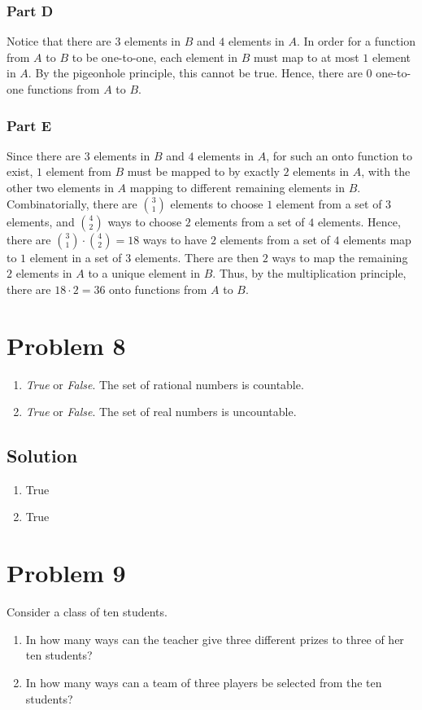 \documentclass[table]{article}
\begin{document}
\subsubsection{Part D}
Notice that there are $3$ elements in $B$ and $4$ elements in $A$. In order for a function from $A$ to $B$ to be one-to-one, each element in $B$ must map to at most $1$ element in $A$. By the pigeonhole principle, this cannot be true. Hence, there are $0$ one-to-one functions from $A$ to $B$.
\subsubsection{Part E}
Since there are $3$ elements in $B$ and $4$ elements in $A$, for such an onto function to exist, $1$ element from $B$ must be mapped to by exactly $2$ elements in $A$, with the other two elements in $A$ mapping to different remaining elements in $B$. Combinatorially, there are $3 \choose 1$ elements to choose $1$ element from a set of $3$ elements, and $4 \choose 2$ ways to choose $2$ elements from a set of $4$ elements. Hence, there are ${3 \choose 1} \cdot {4 \choose 2}=18$ ways to have $2$ elements from a set of $4$ elements map to $1$ element in a set of $3$ elements. There are then $2$ ways to map the remaining $2$ elements in $A$ to a unique element in $B$. Thus, by the multiplication principle, there are $18 \cdot 2 = 36$ onto functions from $A$ to $B$.
\section{Problem 8}
\begin{enumerate}[nosep,label=\alph*)]
\item \textit{True} or \textit{False}. The set of rational numbers is countable.
\item \textit{True} or \textit{False}. The set of real numbers is uncountable.
\end{enumerate}
\subsection{Solution}
\begin{enumerate}[nosep,label=\alph*)]
\item True
\item True
\end{enumerate}
\section{Problem 9}
Consider a class of ten students.
\begin{enumerate}[nosep,label=\alph*)]
\item In how many ways can the teacher give three different prizes to three of her ten students?
\item In how many ways can a team of three players be selected from the ten students?
\end{enumerate}
\end{document}
